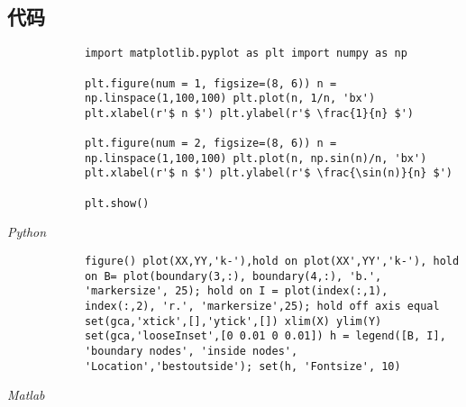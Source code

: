 \documentclass[a4paper, 12pt, UTF8]{ctexart}
\begin{document}
\begin{appendices}
    \section{代码}
    \begin{listing}[ht]
        \begin{verbatim}
            import matplotlib.pyplot as plt import numpy as np
        
            plt.figure(num = 1, figsize=(8, 6)) n =
            np.linspace(1,100,100) plt.plot(n, 1/n, 'bx')
            plt.xlabel(r'$ n $') plt.ylabel(r'$ \frac{1}{n} $')
        
            plt.figure(num = 2, figsize=(8, 6)) n =
            np.linspace(1,100,100) plt.plot(n, np.sin(n)/n, 'bx')
            plt.xlabel(r'$ n $') plt.ylabel(r'$ \frac{\sin(n)}{n} $')
        
            plt.show()
        \end{verbatim}
        \caption{\em Python}
    \end{listing}

    \begin{listing}[ht]
        \begin{verbatim}
            figure() plot(XX,YY,'k-'),hold on plot(XX',YY','k-'), hold
            on B= plot(boundary(3,:), boundary(4,:), 'b.',
            'markersize', 25); hold on I = plot(index(:,1),
            index(:,2), 'r.', 'markersize',25); hold off axis equal
            set(gca,'xtick',[],'ytick',[]) xlim(X) ylim(Y)
            set(gca,'looseInset',[0 0.01 0 0.01]) h = legend([B, I],
            'boundary nodes', 'inside nodes',
            'Location','bestoutside'); set(h, 'Fontsize', 10)
        \end{verbatim}
        \caption{\em Matlab}
    \end{listing}
\end{appendices}
\end{document}
